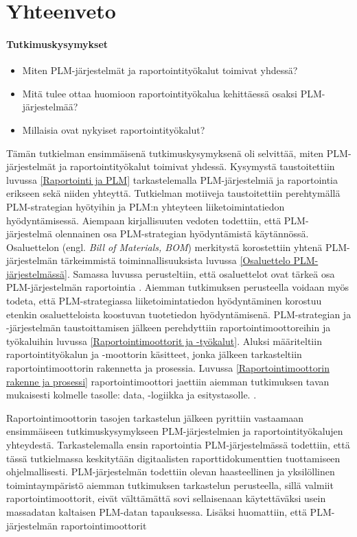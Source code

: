 \chapter{Yhteenveto} \label{Yhteenveto}

\subsubsection{Tutkimuskysymykset}
\begin{itemize}
\item Miten PLM-järjestelmät ja raportointityökalut toimivat yhdessä?
\item Mitä tulee ottaa huomioon raportointityökalua kehittäessä osaksi PLM-järjestelmää?
\item Millaisia ovat nykyiset raportointityökalut?
\end{itemize}


Tämän tutkielman ensimmäisenä tutkimuskysymyksenä oli selvittää, miten PLM-järjestelmät ja raportointityökalut toimivat yhdessä. Kysymystä taustoitettiin luvussa \ref{Raportointi ja PLM} tarkastelemalla PLM-järjestelmiä ja raportointia erikseen sekä niiden yhteyttä. Tutkielman motiiveja taustoitettiin perehtymällä PLM-strategian hyötyihin ja PLM:n yhteyteen liiketoimintatiedon hyödyntämisessä. Aiempaan kirjallisuuten vedoten todettiin, että PLM-järjestelmä olennainen osa PLM-strategian hyödyntämistä käytännössä.\cite{alemanni_key_2008} Osaluettelon (engl. \textit{Bill of Materials, BOM}) merkitystä korostettiin yhtenä PLM-järjestelmän tärkeimmistä toiminnallisuuksista\cite{david_what_2016} luvussa \ref{Osaluettelo PLM-järjestelmässä}. Samassa luvussa perusteltiin, että osaluettelot ovat tärkeä osa PLM-järjestelmän raportointia \cite{german_challenge_2016}. Aiemman tutkimuksen perusteella voidaan myös todeta, että PLM-strategiassa liiketoimintatiedon hyödyntäminen korostuu etenkin osaluetteloista koostuvan tuotetiedon hyödyntämisenä. \cite{bayro-corrochano_preliminary_2014}  PLM-strategian ja -järjestelmän taustoittamisen jälkeen perehdyttiin raportointimoottoreihin ja työkaluihin luvussa \ref{Raportointimoottorit ja -työkalut}. Aluksi määriteltiin raportointityökalun ja -moottorin käsitteet, jonka jälkeen tarkasteltiin raportointimoottorin rakennetta ja prosessia. Luvussa \ref{Raportointimoottorin rakenne ja prosessi} raportointimoottori jaettiin aiemman tutkimuksen tavan mukaisesti kolmelle tasolle: data, -logiikka ja esitystasolle. \cite{he_design_2010}.

Raportointimoottorin tasojen tarkastelun jälkeen pyrittiin vastaamaan ensimmäiseen tutkimuskysymykseen PLM-järjestelmien ja raportointityökalujen yhteydestä. Tarkastelemalla ensin raportointia PLM-järjestelmässä todettiin, että tässä tutkielmassa keskitytään digitaalisten raporttidokumenttien tuottamiseen ohjelmallisesti. PLM-järjestelmän todettiin olevan haasteellinen ja yksilöllinen toimintaympäristö aiemman tutkimuksen tarkastelun perusteella, sillä valmiit raportointimoottorit, eivät välttämättä sovi sellaisenaan käytettäväksi usein massadatan kaltaisen PLM-datan tapauksessa.\cite{rohleder_requirements_2014} Lisäksi huomattiin, että PLM-järjestelmän raportointimoottorit
